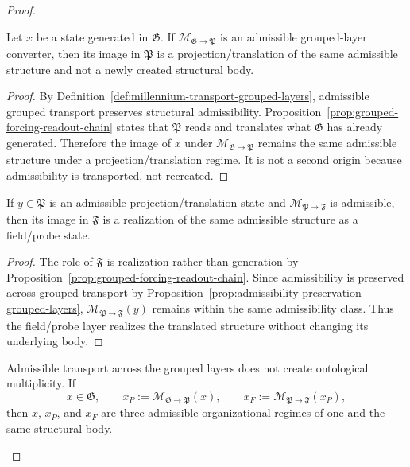 \begin{proof}
\begin{lemma}
\label{lem:group-transport}
Let $x$ be a state generated in $\mathfrak G$. If $\mathcal M_{\mathfrak G\to\mathfrak P}$
is an admissible grouped-layer converter, then its image in $\mathfrak P$ is a
projection/translation of the same admissible structure and not a newly created
structural body.
\end{lemma}

\begin{proof}
By Definition~\ref{def:millennium-transport-grouped-layers}, admissible grouped
transport preserves structural admissibility. Proposition~\ref{prop:grouped-forcing-readout-chain}
states that $\mathfrak P$ reads and translates what $\mathfrak G$ has already
generated. Therefore the image of $x$ under $\mathcal M_{\mathfrak G\to\mathfrak P}$
remains the same admissible structure under a projection/translation regime.
It is not a second origin because admissibility is transported, not recreated.
\end{proof}

\begin{lemma}
\label{lem:group-realization}
If $y\in\mathfrak P$ is an admissible projection/translation state and
$\mathcal M_{\mathfrak P\to\mathfrak F}$ is admissible, then its image in
$\mathfrak F$ is a realization of the same admissible structure as a field/probe
state.
\end{lemma}

\begin{proof}
The role of $\mathfrak F$ is realization rather than generation by
Proposition~\ref{prop:grouped-forcing-readout-chain}. Since admissibility is
preserved across grouped transport by Proposition~\ref{prop:admissibility-preservation-grouped-layers},
$\mathcal M_{\mathfrak P\to\mathfrak F}(y)$ remains within the same
admissibility class. Thus the field/probe layer realizes the translated
structure without changing its underlying body.
\end{proof}

\begin{proposition}
\label{prop:no-ontology-drift}
Admissible transport across the grouped layers does not create ontological
multiplicity. If
\[
x \in \mathfrak G,
\qquad
x_P := \mathcal M_{\mathfrak G\to\mathfrak P}(x),
\qquad
x_F := \mathcal M_{\mathfrak P\to\mathfrak F}(x_P),
\]
then $x$, $x_P$, and $x_F$ are three admissible organizational regimes of one
and the same structural body.
\end{proposition}


\end{proof}
